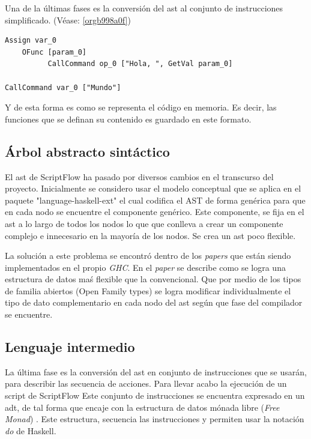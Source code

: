 \documentclass[11pt]{article}
\begin{document}
Una de la últimas fases es la conversión del \gls{ast} al conjunto de
instrucciones simplificado. (Véase: \ref{orgb998a0f})

\begin{verbatim}
Assign var_0
    OFunc [param_0]
          CallCommand op_0 ["Hola, ", GetVal param_0]

CallCommand var_0 ["Mundo"]
\end{verbatim}

Y de esta forma es como se representa el código en memoria. Es decir, las
funciones que se definan su contenido es guardado en este formato.

\subsection{Árbol abstracto sintáctico}
\label{sec:orgcd44e3d}

El \gls{ast} de ScriptFlow ha pasado por diversos cambios en el transcurso del proyecto. Inicialmente
se considero usar el modelo conceptual que se aplica en el paquete "language-haskell-ext" el cual codifica el AST de forma genérica
para que en cada nodo se encuentre el componente genérico. Este componente, se fija en el \gls{ast} a lo largo de todos los nodos lo que
que conlleva a crear un componente complejo e innecesario en la mayoría de los nodos. Se crea un \gls{ast} poco flexible.

La solución a este problema se encontró dentro de los \emph{papers} que están siendo implementados en el propio \emph{GHC}. En el \emph{paper} \cite{shayan-2017-trees}
se describe como se logra una estructura de datos maś flexible que la convencional. Que por medio de los tipos de familia abiertos (Open Family types)
se logra modificar individualmente el tipo de dato complementario en cada nodo del \gls{ast} según que fase del compilador se encuentre.

\subsection{Lenguaje intermedio}
\label{sec:org4d9f88c}

\label{orgb998a0f} La última fase es la conversión del \gls{ast} en conjunto de instrucciones
que se usarán, para describir las secuencia de acciones. Para llevar acabo la ejecución de un script de ScriptFlow
Este conjunto de instrucciones se encuentra expresado en un \gls{adt}, de tal forma que encaje con la estructura
de datos mónada libre (\emph{Free Monad}) \cite{free-monads}. Este estructura, secuencia las instrucciones y permiten usar la notación \emph{do} de Haskell.
\end{document}

